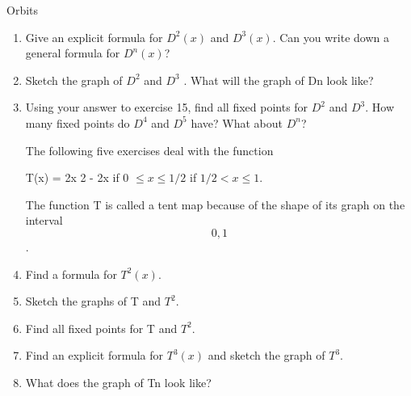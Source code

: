 \begin{frame}{Orbits}

\begin{enumerate}

\item Give an explicit formula for $D^2(x)$ and $D^3(x)$. Can you write down a
general formula for $D^n (x)$?

\item Sketch the graph of $D^2$ and $D^3$ . What will the graph of Dn look like?
\item Using your answer to exercise 15, find all fixed points for $D^2$ and $D^3$. How
many fixed points do $D^4$ and $D^5$ have? What about $D^n$?


The following five exercises deal with the function

T(x) =
2x
2 - 2x
if 0 $\leq x \leq 1/2$
if $1/2 < x \leq 1$.

The function T is called a tent map because of the shape of its graph on the
interval \[0, 1\].

\item Find a formula for $T^2(x)$.
\item Sketch the graphs of T and $T^2$.
\item Find all fixed points for T and $T^2$.
\item Find an explicit formula for $T^3(x)$ and sketch the graph of $T^3$.
\item What does the graph of Tn look like?

\end{enumerate}


\end{frame}

